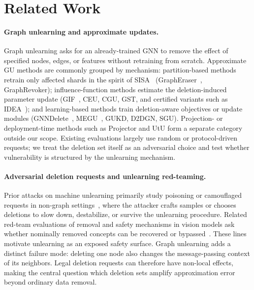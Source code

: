 \section{Related Work}
\label{sec:related}

\paragraph{Graph unlearning and approximate updates.}
Graph unlearning asks for an already-trained GNN to remove the effect of
specified nodes, edges, or features without retraining from scratch.
Approximate GU methods are commonly grouped by mechanism: partition-based
methods retrain only affected shards in the spirit of
SISA~\cite{bourtoule2021machine} (GraphEraser~\cite{chen2022graph},
GraphRevoker); influence-function methods estimate the deletion-induced
parameter update (GIF~\cite{wu2023gif}, CEU, CGU, GST, and certified
variants such as IDEA~\cite{dong2024idea}); and learning-based methods
train deletion-aware objectives or update modules
(GNNDelete~\cite{cheng2023gnndelete}, MEGU~\cite{li2024towards}, GUKD,
D2DGN, SGU). Projection- or deployment-time methods such as Projector and
UtU form a separate category outside our scope. Existing evaluations
largely use random or protocol-driven requests; we treat the deletion set
itself as an adversarial choice and test whether vulnerability is
structured by the unlearning mechanism.

\paragraph{Adversarial deletion requests and unlearning red-teaming.}
Prior attacks on machine unlearning primarily study poisoning or
camouflaged requests in non-graph settings~\cite{marchant2022hard,di2022hidden},
where the attacker crafts samples or chooses deletions to slow down,
destabilize, or survive the unlearning procedure. Related red-team
evaluations of removal and safety mechanisms in vision models ask whether
nominally removed concepts can be recovered or bypassed~\cite{huang2024exploring,tsai2024ringabell,chin2024prompting4debugging}.
These lines motivate unlearning as an exposed safety surface. Graph
unlearning adds a distinct failure mode: deleting one node also changes
the message-passing context of its neighbors. Legal deletion requests can
therefore have non-local effects, making the central question which
deletion sets amplify approximation error beyond ordinary data removal.

